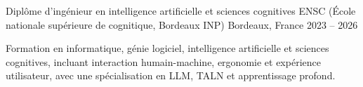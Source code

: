 
\begin{cventries}
  \cventry
    {Diplôme d’ingénieur en intelligence artificielle et sciences cognitives}
    {ENSC (École nationale supérieure de cognitique, Bordeaux INP)}
    {Bordeaux, France}
    {2023 -- 2026}
    {
      \begin{cvitems}
        \item {Formation en informatique, génie logiciel, intelligence artificielle et sciences cognitives, incluant interaction humain-machine, ergonomie et expérience utilisateur, avec une spécialisation en LLM, TALN et apprentissage profond.}
      \end{cvitems}
    }
\end{cventries}
